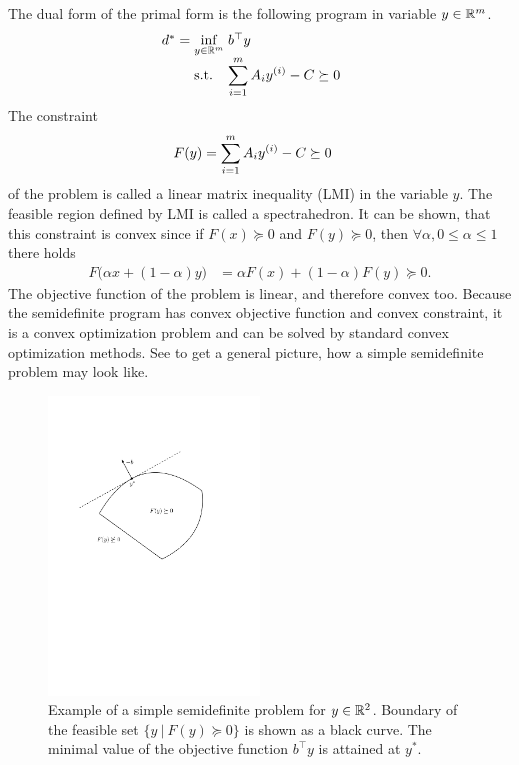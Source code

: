 The dual form of the primal form is the following program in variable $y\in\mathbb{R}^m$.
\begin{align}
  \arraycolsep=1.4pt
  \begin{array}{rclrcl@{\hskip0.5cm}l}
    d^* &=& \displaystyle \inf_{y\in\R^m} & \multicolumn{3}{l}{b^\top y} \\
    && \text{s.t.} & \displaystyle \sum_{i=1}^m A_iy\ind i - C &\succeq& 0
  \end{array}\labeleq{SDP:prelim:dual}
\end{align}
The constraint 
\begin{align}
  F(y) &= \sum_{i=1}^m A_iy^{(i)} - C \succeq 0
\end{align}
of the problem  is called a linear matrix inequality (LMI) in the variable $y$.
The feasible region defined by LMI is called a spectrahedron.
It can be shown, that this constraint is convex since if $F(x) \succeq 0$ and $F(y) \succeq 0$, then $\forall \alpha, 0\leq  \alpha \leq 1$ there holds
\begin{align}
  F\big(\alpha x + (1-\alpha)y\big) &= \alpha F(x) + (1-\alpha)F(y) \succeq 0.
\end{align}
The objective function of the problem  is linear, and therefore convex too.
Because the semidefinite program  has convex objective function and convex constraint, it is a convex optimization problem and can be solved by standard convex optimization methods.
See  to get a general picture, how a simple semidefinite problem may look like.

\begin{figure}[ht]
  \centering
  \includegraphics[width=0.5\textwidth]{drawings/SDP_problem.pdf}
  \caption{Example of a simple semidefinite problem for $y\in\mathbb{R}^2$. Boundary of the feasible set $\big\{y\ |\ F(y)\succeq 0\big\}$ is shown as a black curve. The minimal value of the objective function $b^\top y$ is attained at $y^*$.}
\end{figure}

